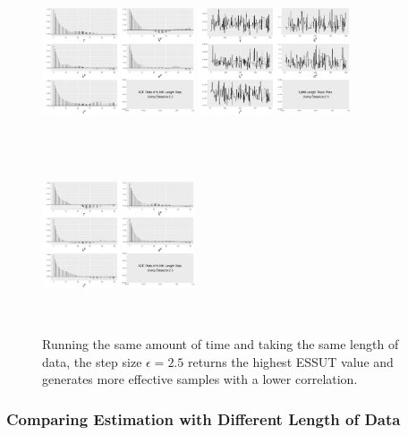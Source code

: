 \begin{figure}[h]
\includegraphics[width=0.4\textwidth,height=5cm]{Chapters/05MCMCOU/plots/gg1k22acf.pdf}
\includegraphics[width=0.4\textwidth,height=5cm]{Chapters/05MCMCOU/plots/gg1k25chain.pdf}
\includegraphics[width=0.4\textwidth,height=5cm]{Chapters/05MCMCOU/plots/gg1k25acf.pdf}
\caption{Running the same amount of time and taking the same length of data, the step size $\epsilon=2.5$ returns the highest ESSUT value and generates more effective samples with a lower correlation. }\label{1koutof8kfigures}
\end{figure}



\clearpage

\subsubsection*{Comparing Estimation with Different Length of Data }


